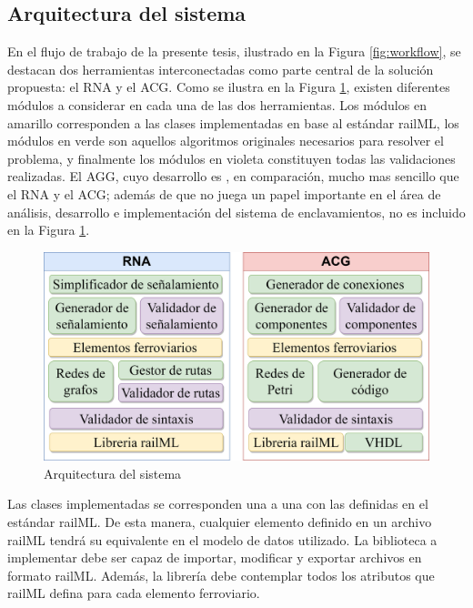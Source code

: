 \subsection{Arquitectura del sistema}

	En el flujo de trabajo de la presente tesis, ilustrado en la Figura \ref{fig:workflow}, se destacan dos herramientas interconectadas como parte central de la solución propuesta: el RNA y el ACG. Como se ilustra en la Figura \ref{fig:architecture}, existen diferentes módulos a considerar en cada una de las dos herramientas. Los módulos en amarillo corresponden a las clases implementadas en base al estándar railML, los módulos en verde son aquellos algoritmos originales necesarios para resolver el problema, y finalmente los módulos en violeta constituyen todas las validaciones realizadas. El AGG, cuyo desarrollo es , en comparación, mucho mas sencillo que el RNA y el ACG; además de que no juega un papel importante en el área de análisis, desarrollo e implementación del sistema de enclavamientos, no es incluido en la Figura \ref{fig:architecture}.

    \begin{figure}[H]
        \centering
        \includegraphics[width=1\textwidth]{Figuras/Architecture.png}
        \centering\caption{Arquitectura del sistema}
        \label{fig:architecture}
    \end{figure}

    Las clases implementadas se corresponden una a una con las definidas en el estándar railML. De esta manera, cualquier elemento definido en un archivo railML tendrá su equivalente en el modelo de datos utilizado. La biblioteca a implementar debe ser capaz de importar, modificar y exportar archivos en formato railML. Además, la librería debe contemplar todos los atributos que railML defina para cada elemento ferroviario.

